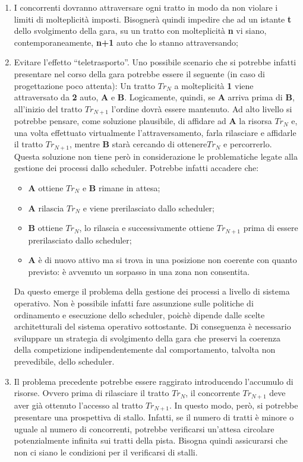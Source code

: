 \begin{enumerate}
\item I concorrenti dovranno attraversare ogni tratto in modo da non violare i limiti di molteplicit\`{a} imposti. Bisogner\`{a} quindi impedire che ad un istante \textbf{t} dello svolgimento della gara, su un tratto con molteplicit\`{a} \textbf{n} vi siano, contemporaneamente, \textbf{n+1} auto che lo stanno attraversando;
\item Evitare l'effetto ``teletrasporto''. Uno possibile scenario che si potrebbe infatti presentare nel corso della gara potrebbe essere il seguente (in caso di progettazione poco attenta):
Un tratto $Tr_N$ a molteplicit\`{a} \textbf{1} viene attraversato da \textbf{2} auto, \textbf{A} e \textbf{B}. Logicamente, quindi, se \textbf{A} arriva prima di \textbf{B}, all'inizio del tratto $Tr_{N+1}$ l'ordine dovr\`{a} essere mantenuto. Ad alto livello si potrebbe pensare, come soluzione plausibile, di affidare ad \textbf{A} la risorsa $Tr_N$ e, una volta effettuato virtualmente l'attraversamento, farla rilasciare e affidarle il tratto $Tr_{N+1}$, mentre \textbf{B} star\`{a} cercando di ottenere$Tr_N$ e percorrerlo.
Questa soluzione non tiene per\`{o} in considerazione le problematiche legate alla gestione dei processi dallo scheduler. Potrebbe infatti accadere che:
\begin{itemize}
\item \textbf{A} ottiene $Tr_N$ e \textbf{B} rimane in attesa;
\item \textbf{A} rilascia $Tr_N$ e viene prerilasciato dallo scheduler;
\item \textbf{B} ottiene $Tr_N$, lo rilascia e successivamente ottiene $Tr_{N+1}$ prima di essere prerilasciato dallo scheduler;
\item \textbf{A} \`{e} di nuovo attivo ma si trova in una posizione non coerente con quanto previsto: \`{e} avvenuto un sorpasso in una zona non consentita.
\end{itemize}
Da questo emerge il problema della gestione dei processi a livello di sistema operativo. Non \`{e} possibile infatti fare assunzione sulle politiche di ordinamento e esecuzione dello scheduler, poich\`{e} dipende dalle scelte architetturali del sistema operativo sottostante. Di conseguenza \`{e} necessario sviluppare un strategia di svolgimento della gara che preservi la coerenza della competizione indipendentemente dal comportamento, talvolta non prevedibile, dello scheduler.
\item Il problema precedente potrebbe essere raggirato introducendo l'accumulo di risorse. Ovvero prima di rilasciare il tratto $Tr_N$, il concorrente $Tr_{N+1}$ deve aver gi\`{a} ottenuto l'accesso al tratto $Tr_{N+1}$. In questo modo, per\`{o}, si potrebbe presentare una prospettiva di stallo. Infatti, se il numero di tratti \`{e} minore o uguale al numero di concorrenti, potrebbe verificarsi un'attesa circolare potenzialmente infinita sui tratti della pista. Bisogna quindi assicurarsi che non ci siano le condizioni per il verificarsi di stalli.
\end{enumerate}
